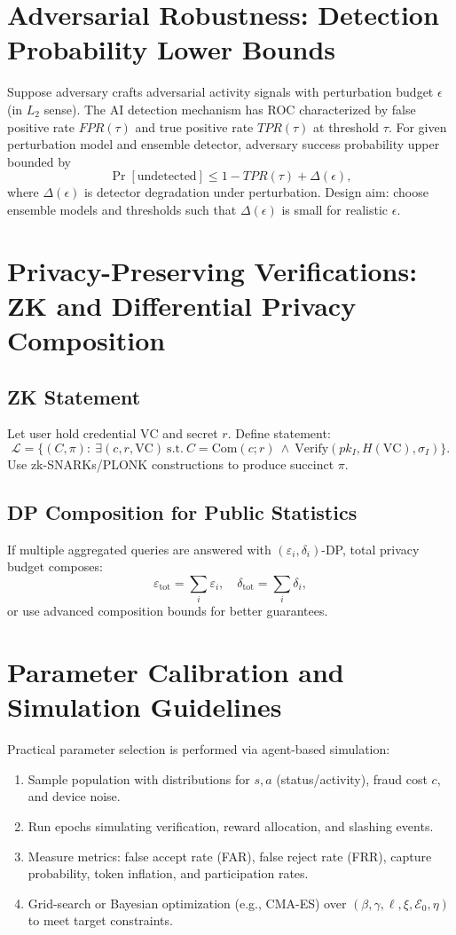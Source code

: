 \documentclass[11pt,a4paper]{article}
\begin{document}
\section{Adversarial Robustness: Detection Probability Lower Bounds}

Suppose adversary crafts adversarial activity signals with perturbation budget \(\epsilon\) (in \(L_2\) sense). The AI detection mechanism has ROC characterized by false positive rate \(FPR(\tau)\) and true positive rate \(TPR(\tau)\) at threshold \(\tau\). For given perturbation model and ensemble detector, adversary success probability upper bounded by
\[
\Pr[\text{undetected}] \le 1 - TPR(\tau) + \Delta(\epsilon),
\]
where \(\Delta(\epsilon)\) is detector degradation under perturbation. Design aim: choose ensemble models and thresholds such that \(\Delta(\epsilon)\) is small for realistic \(\epsilon\).

\section{Privacy-Preserving Verifications: ZK and Differential Privacy Composition}

\subsection{ZK Statement}
Let user hold credential \(\mathrm{VC}\) and secret \(r\). Define statement:
\[
\mathcal{L} = \Big\{(C,\pi):\ \exists (c,r,\mathrm{VC})\ \text{s.t.}\ C=\mathrm{Com}(c;r)\ \wedge\ \mathrm{Verify}(pk_I,H(\mathrm{VC}),\sigma_I)\Big\}.
\]
Use zk-SNARKs/PLONK constructions to produce succinct \(\pi\).

\subsection{DP Composition for Public Statistics}
If multiple aggregated queries are answered with \((\varepsilon_i,\delta_i)\)-DP, total privacy budget composes:
\[
\varepsilon_{\text{tot}} = \sum_i \varepsilon_i,\quad \delta_{\text{tot}} = \sum_i \delta_i,
\]
or use advanced composition bounds for better guarantees.

\section{Parameter Calibration and Simulation Guidelines}

Practical parameter selection is performed via agent-based simulation:
\begin{enumerate}
  \item Sample population with distributions for \(s,a\) (status/activity), fraud cost \(c\), and device noise.
  \item Run epochs simulating verification, reward allocation, and slashing events.
  \item Measure metrics: false accept rate (FAR), false reject rate (FRR), capture probability, token inflation, and participation rates.
  \item Grid-search or Bayesian optimization (e.g., CMA-ES) over \((\beta,\gamma,\ell,\xi,\mathcal{E}_0,\eta)\) to meet target constraints.
\end{enumerate}
\end{document}
